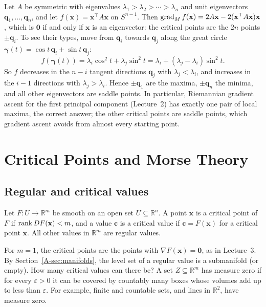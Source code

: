 \begin{example}\label{A-ex:rayleigh-sphere}
    Let $A$ be symmetric with eigenvalues $\lambda_1 > \lambda_2 > \cdots > \lambda_n$ and unit eigenvectors $\mathbf{q}_1, \ldots, \mathbf{q}_n$, and let $f(\mathbf{x}) = \mathbf{x}^\top A\mathbf{x}$ on $S^{n-1}$. Then $\operatorname{grad}_M f(\mathbf{x}) = 2A\mathbf{x} - 2(\mathbf{x}^\top A\mathbf{x})\mathbf{x}$, which is $\mathbf{0}$ if and only if $\mathbf{x}$ is an eigenvector: the critical points are the $2n$ points $\pm\mathbf{q}_i$. To see their types, move from $\mathbf{q}_i$ towards $\mathbf{q}_j$ along the great circle $\boldsymbol{\gamma}(t) = \cos t\,\mathbf{q}_i + \sin t\,\mathbf{q}_j$:
    \[f(\boldsymbol{\gamma}(t)) = \lambda_i\cos^2 t + \lambda_j\sin^2 t = \lambda_i + (\lambda_j - \lambda_i)\sin^2 t.\]
    So $f$ decreases in the $n - i$ tangent directions $\mathbf{q}_j$ with $\lambda_j < \lambda_i$, and increases in the $i - 1$ directions with $\lambda_j > \lambda_i$. Hence $\pm\mathbf{q}_1$ are the maxima, $\pm\mathbf{q}_n$ the minima, and all other eigenvectors are saddle points. In particular, Riemannian gradient ascent for the first principal component (Lecture~2) has exactly one pair of local maxima, the correct answer; the other critical points are saddle points, which gradient ascent avoids from almost every starting point.
\end{example}

\section{Critical Points and Morse Theory}\label{A-sec:morse}

\subsection{Regular and critical values}

\begin{definition}\label{A-def:critical-maps}
    Let $F: U \to \mathbb{R}^m$ be smooth on an open set $U \subseteq \mathbb{R}^n$. A point $\mathbf{x}$ is a critical point of $F$ if $\operatorname{rank} DF(\mathbf{x}) < m$, and a value $\mathbf{c}$ is a critical value if $\mathbf{c} = F(\mathbf{x})$ for a critical point $\mathbf{x}$. All other values in $\mathbb{R}^m$ are regular values.
\end{definition}

For $m = 1$, the critical points are the points with $\nabla F(\mathbf{x}) = \mathbf{0}$, as in Lecture~3. By Section~\ref{A-sec:manifolds}, the level set of a regular value is a submanifold (or empty). How many critical values can there be? A set $Z \subseteq \mathbb{R}^m$ has measure zero if for every $\varepsilon > 0$ it can be covered by countably many boxes whose volumes add up to less than $\varepsilon$. For example, finite and countable sets, and lines in $\mathbb{R}^2$, have measure zero.

